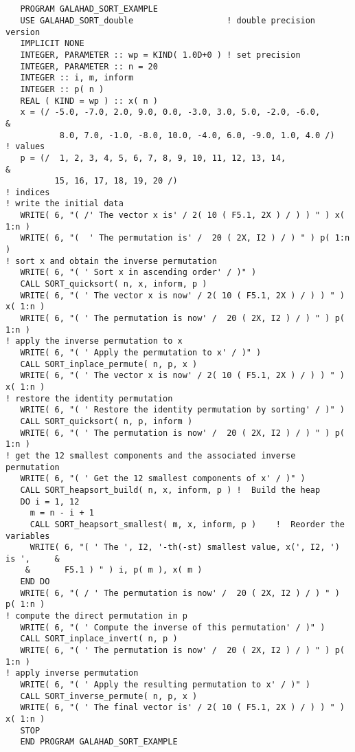 \documentclass{galahad}
\begin{document}
{\tt
\begin{verbatim}

   PROGRAM GALAHAD_SORT_EXAMPLE
   USE GALAHAD_SORT_double                   ! double precision version
   IMPLICIT NONE 
   INTEGER, PARAMETER :: wp = KIND( 1.0D+0 ) ! set precision 
   INTEGER, PARAMETER :: n = 20
   INTEGER :: i, m, inform 
   INTEGER :: p( n ) 
   REAL ( KIND = wp ) :: x( n ) 
   x = (/ -5.0, -7.0, 2.0, 9.0, 0.0, -3.0, 3.0, 5.0, -2.0, -6.0,              &
           8.0, 7.0, -1.0, -8.0, 10.0, -4.0, 6.0, -9.0, 1.0, 4.0 /)    ! values 
   p = (/  1, 2, 3, 4, 5, 6, 7, 8, 9, 10, 11, 12, 13, 14,                     &
          15, 16, 17, 18, 19, 20 /)                                    ! indices
! write the initial data
   WRITE( 6, "( /' The vector x is' / 2( 10 ( F5.1, 2X ) / ) ) " ) x( 1:n )
   WRITE( 6, "(  ' The permutation is' /  20 ( 2X, I2 ) / ) " ) p( 1:n )
! sort x and obtain the inverse permutation
   WRITE( 6, "( ' Sort x in ascending order' / )" )
   CALL SORT_quicksort( n, x, inform, p )
   WRITE( 6, "( ' The vector x is now' / 2( 10 ( F5.1, 2X ) / ) ) " ) x( 1:n )
   WRITE( 6, "( ' The permutation is now' /  20 ( 2X, I2 ) / ) " ) p( 1:n )
! apply the inverse permutation to x
   WRITE( 6, "( ' Apply the permutation to x' / )" )
   CALL SORT_inplace_permute( n, p, x )
   WRITE( 6, "( ' The vector x is now' / 2( 10 ( F5.1, 2X ) / ) ) " )  x( 1:n )
! restore the identity permutation
   WRITE( 6, "( ' Restore the identity permutation by sorting' / )" )
   CALL SORT_quicksort( n, p, inform )
   WRITE( 6, "( ' The permutation is now' /  20 ( 2X, I2 ) / ) " ) p( 1:n )
! get the 12 smallest components and the associated inverse permutation
   WRITE( 6, "( ' Get the 12 smallest components of x' / )" )
   CALL SORT_heapsort_build( n, x, inform, p ) !  Build the heap
   DO i = 1, 12 
     m = n - i + 1 
     CALL SORT_heapsort_smallest( m, x, inform, p )    !  Reorder the variables
     WRITE( 6, "( ' The ', I2, '-th(-st) smallest value, x(', I2, ') is ',     &
    &       F5.1 ) " ) i, p( m ), x( m ) 
   END DO  
   WRITE( 6, "( / ' The permutation is now' /  20 ( 2X, I2 ) / ) " ) p( 1:n )
! compute the direct permutation in p
   WRITE( 6, "( ' Compute the inverse of this permutation' / )" )
   CALL SORT_inplace_invert( n, p )
   WRITE( 6, "( ' The permutation is now' /  20 ( 2X, I2 ) / ) " ) p( 1:n ) 
! apply inverse permutation
   WRITE( 6, "( ' Apply the resulting permutation to x' / )" )
   CALL SORT_inverse_permute( n, p, x )
   WRITE( 6, "( ' The final vector is' / 2( 10 ( F5.1, 2X ) / ) ) " ) x( 1:n )
   STOP 
   END PROGRAM GALAHAD_SORT_EXAMPLE

\end{verbatim}
}
\end{document}
